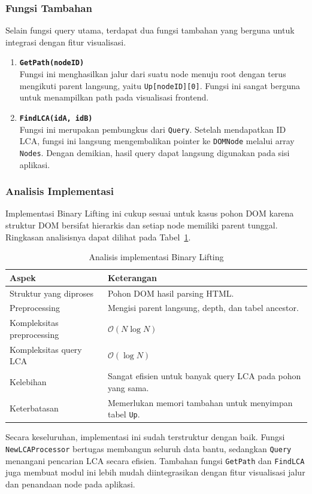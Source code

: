 \subsubsection{Fungsi Tambahan}

Selain fungsi query utama, terdapat dua fungsi tambahan yang berguna untuk integrasi
dengan fitur visualisasi.

\begin{enumerate}
    \item \textbf{\texttt{GetPath(nodeID)}}\\
    Fungsi ini menghasilkan jalur dari suatu node menuju root dengan terus mengikuti
    parent langsung, yaitu \texttt{Up[nodeID][0]}. Fungsi ini sangat berguna untuk
    menampilkan path pada visualisasi frontend.

    \item \textbf{\texttt{FindLCA(idA, idB)}}\\
    Fungsi ini merupakan pembungkus dari \texttt{Query}. Setelah mendapatkan ID LCA,
    fungsi ini langsung mengembalikan pointer ke \texttt{DOMNode} melalui array
    \texttt{Nodes}. Dengan demikian, hasil query dapat langsung digunakan pada sisi aplikasi.
\end{enumerate}

\subsubsection{Analisis Implementasi}

Implementasi Binary Lifting ini cukup sesuai untuk kasus pohon DOM karena struktur DOM
bersifat hierarkis dan setiap node memiliki parent tunggal. Ringkasan analisisnya dapat
dilihat pada Tabel~\ref{tab:analisis-binary-lifting}.

\begin{table}[H]
\centering
\caption{Analisis implementasi Binary Lifting}
\label{tab:analisis-binary-lifting}
\begin{tabular}{|l|p{8.8cm}|}
\hline
\textbf{Aspek} & \textbf{Keterangan} \\ \hline
Struktur yang diproses & Pohon DOM hasil parsing HTML. \\ \hline
Preprocessing & Mengisi parent langsung, depth, dan tabel ancestor. \\ \hline
Kompleksitas preprocessing & $\mathcal{O}(N \log N)$ \\ \hline
Kompleksitas query LCA & $\mathcal{O}(\log N)$ \\ \hline
Kelebihan & Sangat efisien untuk banyak query LCA pada pohon yang sama. \\ \hline
Keterbatasan & Memerlukan memori tambahan untuk menyimpan tabel \texttt{Up}. \\ \hline
\end{tabular}
\end{table}

Secara keseluruhan, implementasi ini sudah terstruktur dengan baik. Fungsi
\texttt{NewLCAProcessor} bertugas membangun seluruh data bantu, sedangkan
\texttt{Query} menangani pencarian LCA secara efisien. Tambahan fungsi
\texttt{GetPath} dan \texttt{FindLCA} juga membuat modul ini lebih mudah diintegrasikan
dengan fitur visualisasi jalur dan penandaan node pada aplikasi.